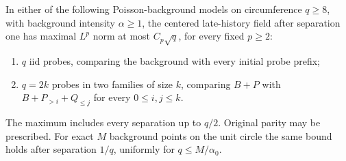 \documentclass[11pt,letterpaper]{article}
\begin{document}
\begin{theorem}
\label{thm:late-prefix-maximal}
In either of the following Poisson-background models on
circumference $q\ge8$, with background intensity $\alpha\ge1$,
the centered late-history field after separation one has
maximal $L^p$ norm at most $C_p\sqrt q$, for every fixed
$p\ge2$:
\begin{enumerate}
\item $q$ iid probes, comparing the background with every
      initial probe prefix;
\item $q=2k$ probes in two families of size $k$, comparing
      $B+P$ with $B+P_{>i}+Q_{\le j}$ for every $0\le i,j\le k$.
\end{enumerate}
The maximum includes every separation up to $q/2$.
Original parity may be prescribed.
For exact $M$ background points on the unit circle the same
bound holds after separation $1/q$, uniformly for
$q\le M/\alpha_0$.
\end{theorem}
\end{document}
